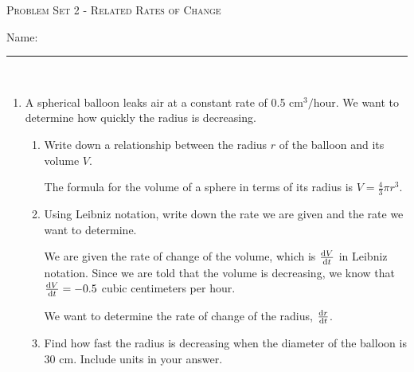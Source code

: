 \documentclass{article}
\begin{document}
\begin{center}
  \large\textsc{Problem Set 2 - Related Rates of Change}
  
  \pspace{12pt}
  \begin{problemonly}\large Name: \rule{5cm}{0.15mm}\\ \end{problemonly}
\end{center}

\begin{enumerate}

\item 

  A spherical balloon leaks air at a constant rate of 0.5
  $\text{cm}^3/\text{hour}$. We want to determine how quickly the radius is decreasing.
  \begin{enumerate}

  \item 
  \begin{problem}
      Write down a relationship between the radius $r$ of the balloon and its volume $V$.
  \end{problem}
  \pspace{\vfill}

  \begin{solution}
  The formula for the volume of a sphere in terms of its radius is $V=\frac{4}{3}\pi r^3$.
  \end{solution}

  \item
  \begin{problem}
      Using Leibniz notation, write down the rate we are given and the rate we want to determine.
  \end{problem}
  \pspace{\vfill}

  \begin{solution}
      We are given the rate of change of the volume, which is $\diff{V}{t}$ in Leibniz notation. Since we are told that the volume is decreasing, we know that $\diff{V}{t} = -0.5$ cubic centimeters per hour.

      We want to determine the rate of change of the radius, $\diff{r}{t}$. 
  \end{solution}

  \item
\begin{problem}[\stretch{3}]
      Find how fast the radius is decreasing when the diameter of the balloon is 30 cm.  Include units in your answer.
    \end{problem}

    \begin{solution} 


\end{solution}
\end{enumerate}
\end{enumerate}
\end{document}
